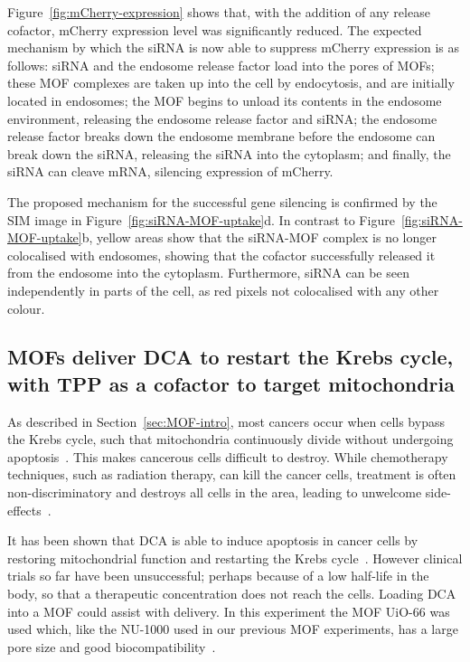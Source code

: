Figure~\ref{fig:mCherry-expression} shows that, with the addition of any release cofactor, mCherry expression level was significantly reduced.
The expected mechanism by which the siRNA is now able to suppress mCherry expression is as follows: siRNA and the endosome release factor load into the pores of MOFs; these MOF complexes are taken up into the cell by endocytosis, and are initially located in endosomes; the MOF begins to unload its contents in the endosome environment, releasing the endosome release factor and siRNA; the endosome release factor breaks down the endosome membrane before the endosome can break down the siRNA, releasing the siRNA into the cytoplasm; and finally, the siRNA can cleave mRNA, silencing expression of mCherry.

The proposed mechanism for the successful gene silencing is confirmed by the SIM image in Figure~\ref{fig:siRNA-MOF-uptake}d.
In contrast to Figure~\ref{fig:siRNA-MOF-uptake}b, yellow areas show that the siRNA-MOF complex is no longer colocalised with endosomes, showing that the cofactor successfully released it from the endosome into the cytoplasm.
Furthermore, siRNA can be seen independently in parts of the cell, as red pixels not colocalised with any other colour.

\subsection{MOFs deliver DCA to restart the Krebs cycle, with TPP as a cofactor to target mitochondria}
As described in Section~\ref{sec:MOF-intro}, most cancers occur when cells bypass the Krebs cycle, such that mitochondria continuously divide without undergoing apoptosis~\cite{murray1993cell}.
This makes cancerous cells difficult to destroy.
While chemotherapy techniques, such as radiation therapy, can kill the cancer cells, treatment is often non-discriminatory and destroys all cells in the area, leading to unwelcome side-effects~\cite{coates1983receiving, de1997patient, minami2010cardiovascular}.

It has been shown that DCA is able to induce apoptosis in cancer cells by restoring mitochondrial function and restarting the Krebs cycle~\cite{bonnet2007mitochondria}.
However clinical trials so far have been unsuccessful; perhaps because of a low half-life in the body, so that a therapeutic concentration does not reach the cells.
Loading DCA into a MOF could assist with delivery.
In this experiment the MOF UiO-66 was used which, like the NU-1000 used in our previous MOF experiments, has a large pore size and good biocompatibility~\cite{abanades2018mechanistic}.

